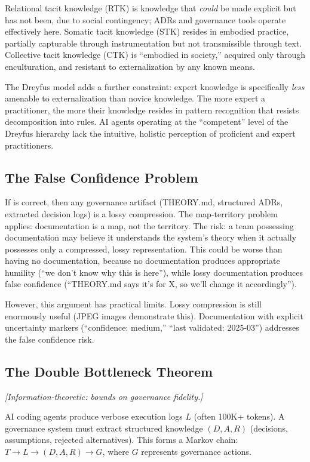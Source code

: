 \documentclass[11pt, a4paper, logo, copyright]{googledeepmind}
\begin{document}
Relational tacit knowledge (RTK) is knowledge that \emph{could} be made explicit but has not been, due to social contingency; ADRs and governance tools operate effectively here. Somatic tacit knowledge (STK) resides in embodied practice, partially capturable through instrumentation but not transmissible through text. Collective tacit knowledge (CTK) is ``embodied in society,'' acquired only through enculturation, and resistant to externalization by any known means.

The Dreyfus model adds a further constraint: expert knowledge is specifically \emph{less} amenable to externalization than novice knowledge. The more expert a practitioner, the more their knowledge resides in pattern recognition that resists decomposition into rules. AI agents operating at the ``competent'' level of the Dreyfus hierarchy lack the intuitive, holistic perception of proficient and expert practitioners.

\subsection{The False Confidence Problem}

If \citet{naur1985} is correct, then any governance artifact (THEORY.md, structured ADRs, extracted decision logs) is a lossy compression. The map-territory problem applies: documentation is a map, not the territory. The risk: a team possessing documentation may believe it understands the system's theory when it actually possesses only a compressed, lossy representation. This could be worse than having no documentation, because no documentation produces appropriate humility (``we don't know why this is here''), while lossy documentation produces false confidence (``THEORY.md says it's for X, so we'll change it accordingly'').

However, this argument has practical limits. Lossy compression is still enormously useful (JPEG images demonstrate this). Documentation with explicit uncertainty markers (``confidence: medium,'' ``last validated: 2025-03'') addresses the false confidence risk.

\subsection{The Double Bottleneck Theorem}
\emph{[Information-theoretic: bounds on governance fidelity.]}

AI coding agents produce verbose execution logs $L$ (often 100K+ tokens). A governance system must extract structured knowledge $(D, A, R)$ (decisions, assumptions, rejected alternatives). This forms a Markov chain: $T \to L \to (D, A, R) \to G$, where $G$ represents governance actions.
\end{document}
